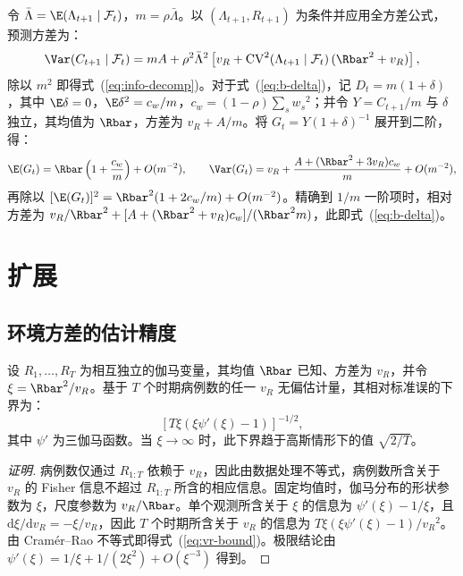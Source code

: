 令 $\bar{\Lambda}=\E(\Lambda_{t+1}\mid\mathcal{F}_t)$，$m=\rho\bar{\Lambda}$。以 $(\Lambda_{t+1},R_{t+1})$ 为条件并应用全方差公式，预测方差为：
\begin{equation}
  \Var(C_{t+1}\mid\mathcal{F}_t)=mA+\rho^2\bar{\Lambda}^2\left[v_R+\mathrm{CV}^2(\Lambda_{t+1}\mid\mathcal{F}_t)\,(\Rbar^2+v_R)\right],
\end{equation}
除以 $m^2$ 即得式~(\ref{eq:info-decomp})。对于式~(\ref{eq:b-delta})，记 $D_t=m(1+\delta)$，其中 $\E\delta=0$，$\E\delta^2=c_w/m$，$c_w=(1-\rho)\sum_sw_s{}^2$；并令 $Y=C_{t+1}/m$ 与 $\delta$ 独立，其均值为 $\Rbar$，方差为 $v_R+A/m$。将 $G_t=Y(1+\delta)^{-1}$ 展开到二阶，得：
\begin{equation}
  \E(G_t)=\Rbar\left(1+\frac{c_w}{m}\right)+O(m^{-2}),\qquad %
  \Var(G_t)=v_R+\frac{A+(\Rbar^2+3v_R)c_w}{m}+O(m^{-2}),
\end{equation}
再除以 $[\E(G_t)]^2=\Rbar^2(1+2c_w/m)+O(m^{-2})$。精确到 $1/m$ 一阶项时，相对方差为 $v_R/\Rbar^2+[A+(\Rbar^2+v_R)c_w]/(\Rbar^2m)$，此即式~(\ref{eq:b-delta})。

\section{扩展}
\label{app:extensions}

\subsection{环境方差的估计精度}
\label{app:vr-precision}

\begin{proposition}[环境方差的估计精度]
\label{prop:vr-precision}
设 $R_1,\dots,R_T$ 为相互独立的伽马变量，其均值 $\Rbar$ 已知、方差为 $v_R$，并令 $\xi=\Rbar^2/v_R$。基于 $T$ 个时期病例数的任一 $v_R$ 无偏估计量，其相对标准误的下界为：
\begin{equation}
  \left[T\xi\left(\xi\psi'(\xi)-1\right)\right]^{-1/2},
  \label{eq:vr-bound}
\end{equation}
其中 $\psi'$ 为三伽马函数。当 $\xi\to\infty$ 时，此下界趋于高斯情形下的值 $\sqrt{2/T}$。
\end{proposition}

\begin{proof}[证明]
病例数仅通过 $R_{1:T}$ 依赖于 $v_R$，因此由数据处理不等式，病例数所含关于 $v_R$ 的 Fisher 信息不超过 $R_{1:T}$ 所含的相应信息。固定均值时，伽马分布的形状参数为 $\xi$，尺度参数为 $v_R/\Rbar$。单个观测所含关于 $\xi$ 的信息为 $\psi'(\xi)-1/\xi$，且 $\mathrm{d}\xi/\mathrm{d}v_R=-\xi/v_R$，因此 $T$ 个时期所含关于 $v_R$ 的信息为 $T\xi(\xi\psi'(\xi)-1)/v_R{}^2$。由 Cram\'er--Rao 不等式即得式~(\ref{eq:vr-bound})。极限结论由 $\psi'(\xi)=1/\xi+1/(2\xi^2)+O(\xi^{-3})$ 得到。
\end{proof}

